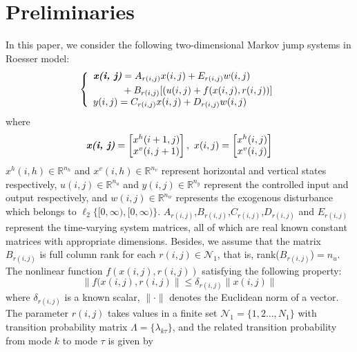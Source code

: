 \documentclass[conference]{IEEEtran}
\begin{document}
\section{Preliminaries} \label{priliminaries}
	In this paper, we consider the following two-dimensional Markov jump systems in Roesser model:
	\begin{equation} \label{system-equation}
	\left\{
		\begin{array}{lr}
			\begin{split}
				\emph{\textbf{x(i, j)}} &= A_{r(i,j)}x(i,j)+E_{r(i,j)}w(i,j)\\
										&+B_{r(i,j)}[(u(i,j)+f(x(i,j),r(i,j))]
			\end{split}\\
			\begin{split}
				y(i,j) = C_{r(i,j)}x(i,j)+D_{r(i,j)}w(i,j)
			\end{split}
		\end{array}
	\right.
	\end{equation}
	where
	\begin{equation*}
		\emph{\textbf{x(i, j)}} = \begin{bmatrix}
			x^{h}(i+1,j)\\
			x^{v}(i,j+1)
		\end{bmatrix}, \ 
		x(i, j) = \begin{bmatrix}
		x^{h}(i,j)\\
		x^{v}(i,j)
		\end{bmatrix}          
	\end{equation*}
	$x^{h}(i,h)\in \mathbb{R}^{n_h}$ and $x^{v}(i,h)\in \mathbb{R}^{n_v}$ represent horizontal and vertical states respectively, $u(i,j) \in \mathbb{R}^{n_u}$ and $y(i,j) \in \mathbb{R}^{n_y}$ represent the controlled input and output respectively, and $w(i,j) \in \mathbb{R}^{n_w}$ represents the exogenous disturbance which belongs to $\ell_{2}\{[0,\infty),[0,\infty)\}$. $A_{r(i,j)}$,$B_{r(i,j)}$,$C_{r(i,j)}$,$D_{r(i,j)}$ and $E_{r(i,j)}$ represent the time-varying system matrices, all of which are real known constant matrices with appropriate dimensions. Besides, we assume that the matrix $B_{r(i,j)}$ is full column rank for each $r(i,j)\in\mathcal{N}_{1}$, that is, rank($B_{r(i,j)}$)$=n_u$. The nonlinear function $f(x(i,j),r(i,j))$ satisfying the following property:
	\begin{equation}\label{nonlinear-func}
		\|f(x(i,j),r(i,j)\| \leq \delta_{r(i,j)}\|x(i,j)\|
	\end{equation}
	where $\delta_{r(i,j)}$ is a known scalar, $\|\cdot\|$ denotes the Euclidean norm of a vector. The parameter $r(i,j)$ takes values in a finite set $\mathcal{N}_{1}=\{1,2...,N_{1} \}$ with transition probability matrix $\varLambda = \{\lambda_{k\tau}\}$, and the related transition probability from mode $k$ to mode $\tau$ is given by 
\end{document}
